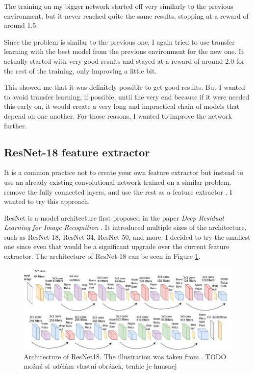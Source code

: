 \documentclass[
  digital,     %
  oneside,     %
  nosansbold,  %
  nocolorbold, %
  lof,         %
  lot,         %
]{fithesis4}
\begin{document}
The training on my bigger network started off very similarly to the previous environment, but it never reached quite the same results, stopping at a reward of around 1.5.

Since the problem is similar to the previous one, I again tried to use transfer learning with the best model from the previous environment for the new one. It actually started with very good results and stayed at a reward of around 2.0 for the rest of the training, only improving a little bit.

This showed me that it was definitely possible to get good results. But I wanted to avoid transfer learning, if possible, until the very end because if it were needed this early on, it would create a very long and impractical chain of models that depend on one another. For those reasons, I wanted to improve the network further.

\subsection{ResNet-18 feature extractor}
\label{subsec:resnet}

It is a common practice not to create your own feature extractor but instead to use an already existing convolutional network trained on a similar problem, remove the fully connected layers, and use the rest as a feature extractor \cite[p. 256]{DLforVisualSystems}. I wanted to try this approach.

ResNet is a model architecture first proposed in the paper \textit{Deep Residual Learning for Image Recognition} \cite{ResNet18}. It introduced multiple sizes of the architecture, such as ResNet-18, ResNet-34, ResNet-50, and more. I decided to try the smallest one since even that would be a significant upgrade over the current feature extractor. The architecture of ResNet-18 can be seen in Figure \ref{fig:resnet}.

\begin{figure}
    \centering
    \includegraphics[width=1\linewidth]{diagrams/resnet.png}
    \caption{Architecture of ResNet18. The illustration was taken from \cite{resnet_illustration}. TODO možná si udělám vlastní obrázek, tenhle je hnusnej}
    \label{fig:resnet}
\end{figure}
\end{document}
